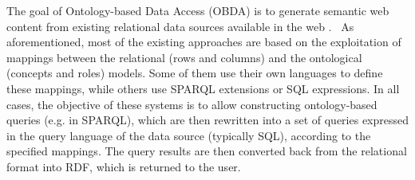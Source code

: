 The goal of Ontology-based Data Access (OBDA) is to \linebreak generate semantic web content from existing relational data sources available in the web \cite{Sahoo_09}.\
%
As aforementioned, most of the existing approaches are based on the exploitation of mappings between the relational
(rows and columns) and the ontological (concepts and roles) models. Some of them use their own languages to define
these mappings, while others use SPARQL extensions or SQL expressions.
In all cases, the objective of these systems is to allow constructing ontology-based queries (e.g. in SPARQL), which
are then rewritten into a set of queries expressed in the query language of the data source (typically SQL), according
to the specified mappings. The query results are then converted back from the relational format into RDF, which is
returned to the user.

